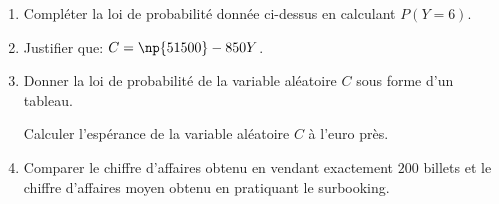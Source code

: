 \begin{enumerate}
	\begin{enumerate}
		\item Compléter la loi de probabilité donnée ci-dessus en calculant $P(Y = 6)$.
		\item Justifier que: $C = \np{51500} - 850Y$.
		\item Donner la loi de probabilité de la variable aléatoire $C$ sous forme d'un tableau.
		
Calculer l'espérance de la variable aléatoire $C$ à l'euro près.
		\item Comparer le chiffre d'affaires obtenu en vendant exactement $200$ billets et le chiffre d'affaires moyen obtenu en pratiquant le surbooking.
	\end{enumerate}
\end{enumerate}

\bigskip

